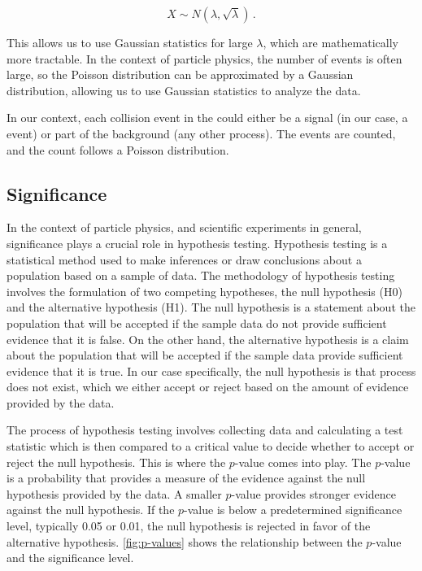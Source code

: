 \begin{equation}
    X \sim N(\lambda, \sqrt{\lambda})\,.
\end{equation}

This allows us to use Gaussian statistics for large $\lambda$, which are mathematically more tractable. In the context
of particle physics, the number of events is often large, so the Poisson distribution can be approximated by a Gaussian
distribution, allowing us to use Gaussian statistics to analyze the data.

In our context, each collision event in the \tth could either be a signal (in our case, a \tth event) or part of the
background (any other process). The events are counted, and the count follows a Poisson distribution.

\subsection{Significance}

In the context of particle physics, and scientific experiments in general, significance plays a crucial role in
hypothesis testing. Hypothesis testing is a statistical method used to make inferences or draw conclusions about a
population based on a sample of data. The methodology of hypothesis testing involves the formulation of two competing
hypotheses, the null hypothesis (H0) and the alternative hypothesis (H1). The null hypothesis is a statement about the
population that will be accepted if the sample data do not provide sufficient evidence that it is false. On the other
hand, the alternative hypothesis is a claim about the population that will be accepted if the sample data provide
sufficient evidence that it is true. In our case specifically, the null hypothesis is that \tth process does not exist,
which we either accept or reject based on the amount of evidence provided by the data.

The process of hypothesis testing involves collecting data and calculating a test statistic which is then compared to a
critical value to decide whether to accept or reject the null hypothesis. This is where the $p$-value comes into
play. The $p$-value is a probability that provides a measure of the evidence against the null hypothesis provided by the
data. A smaller $p$-value provides stronger evidence against the null hypothesis. If the $p$-value is below a
predetermined significance level, typically 0.05 or 0.01, the null hypothesis is rejected in favor of the alternative
hypothesis. \autoref{fig:p-values} shows the relationship between the $p$-value and the significance level.


